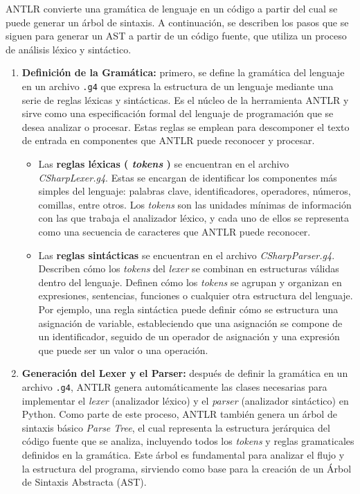   ANTLR convierte una gramática de lenguaje en un código a partir del cual se puede generar un árbol de sintaxis. A continuación, se describen los pasos que se siguen para generar un AST a partir de un código fuente, que utiliza un proceso de análisis léxico y sintáctico.
 
 \begin{enumerate}
    \item \textbf{Definición de la Gramática:}
    primero, se define la gramática del lenguaje en un archivo \texttt{.g4} que expresa la estructura de un lenguaje mediante una serie de reglas léxicas y sintácticas. Es el núcleo de la herramienta ANTLR y sirve como una especificación formal del lenguaje de programación que se desea analizar o procesar. Estas reglas se emplean para descomponer el texto de entrada en componentes que ANTLR puede reconocer y procesar. 
    \begin{itemize}
    \item Las \textbf{reglas léxicas ( \textit{tokens} )} se encuentran en el archivo \textit{CSharpLexer.g4}. Estas  se encargan de identificar los componentes más simples del lenguaje: palabras clave, identificadores, operadores, números, comillas, entre otros. Los \textit{tokens} son las unidades mínimas de información con las que trabaja el analizador léxico, y cada uno de ellos se representa como una secuencia de caracteres que ANTLR puede reconocer.
    
    \item Las \textbf{reglas sintácticas} se encuentran en el archivo \textit{CSharpParser.g4}. Describen cómo los \textit{tokens} del \textit{lexer} se combinan en estructuras válidas dentro del lenguaje. Definen cómo los \textit{tokens} se agrupan y organizan en expresiones, sentencias, funciones o cualquier otra estructura del lenguaje. Por ejemplo, una regla sintáctica puede definir cómo se estructura una asignación de variable, estableciendo que una asignación se compone de un identificador, seguido de un operador de asignación y una expresión que puede ser un valor o una operación.
\end{itemize}

    \item \textbf{Generación del Lexer y el Parser:}
    después de definir la gramática en un archivo \texttt{.g4}, ANTLR genera automáticamente las clases necesarias para implementar el \textit{lexer} (analizador léxico) y el \textit{parser} (analizador sintáctico) en Python. 
 Como parte de este proceso, ANTLR también genera un árbol de sintaxis básico \textit{Parse Tree}, el cual representa la estructura jerárquica del código fuente que se analiza, incluyendo todos los \textit{tokens} y reglas gramaticales definidos en la gramática. Este árbol es fundamental para analizar el flujo y la estructura del programa, sirviendo como base para la creación de un Árbol de Sintaxis Abstracta (AST).


\end{enumerate}
